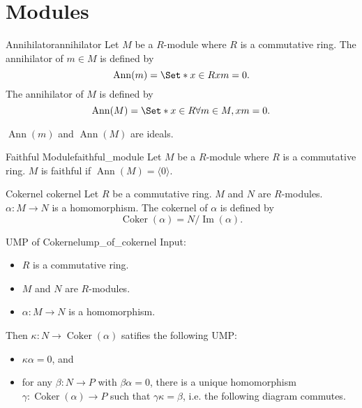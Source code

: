 \documentclass{article}
\begin{document}
\section{Modules}

\begin{definition}{Annihilator}{annihilator}
    Let $M$ be a $R$-module where $R$ is a commutative ring.
    The annihilator of $m\in M$ is defined by
    \[ \operatorname{Ann}(m) = \Set*{x\in R}{xm = 0}. \]
    The annihilator of $M$ is defined by
    \[ \operatorname{Ann}(M) = \Set*{x\in R}{\forall m\in M, xm = 0}. \]
\end{definition}

$\operatorname{Ann}(m)$ and $\operatorname{Ann}(M)$ are ideals.

\begin{definition}{Faithful Module}{faithful_module}
    Let $M$ be a $R$-module where $R$ is a commutative ring.
    $M$ is faithful if $\operatorname{Ann}(M) = \langle 0 \rangle$.
\end{definition}

\begin{definition}{Cokernel }{cokernel}
    Let $R$ be a commutative ring.
    $M$ and $N$ are $R$-modules.
    $\alpha: M\rightarrow N$ is a homomorphism.
    The cokernel of $\alpha$ is defined by
    \[ \operatorname{Coker}(\alpha) = N/\operatorname{Im}(\alpha). \]
\end{definition}

\begin{proposition}{UMP of Cokernel}{ump_of_cokernel}
    Input:
    \begin{itemize}
        \item $R$ is a commutative ring.
        \item $M$ and $N$ are $R$-modules.
        \item $\alpha: M\rightarrow N$ is a homomorphism.
    \end{itemize}
    Then $\kappa: N \rightarrow \operatorname{Coker}(\alpha)$ satifies the following UMP:
    \begin{itemize}
        \item $\kappa \alpha = 0$, and
        \item for any $\beta: N\rightarrow P$ with $\beta \alpha = 0$, there is a unique homomorphism $\gamma: \operatorname{Coker}(\alpha) \rightarrow P$ such that $\gamma \kappa = \beta$, i.e. the following diagram commutes.
    \end{itemize}
    \begin{center}
    \end{center}
\end{proposition}
\end{document}
